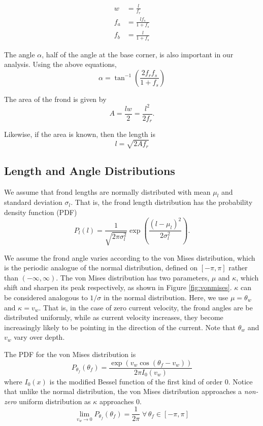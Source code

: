 \begin{align}
	w &= \frac{l}{f_r} \\
	f_a &= \frac{lf_s}{1+f_s} \\
	f_b &= \frac{l}{1+f_s}
\end{align}

The angle $\alpha$, half of the angle at the base corner, is also important in our analysis.
Using the above equations,
\begin{equation}
	\alpha = \tan^{-1}\left(\frac{2f_rf_s}{1+f_s}\right)
\end{equation}

The area of the frond is given by
\begin{equation}
  A = \frac{lw}{2} = \frac{l^2}{2f_r}.
\end{equation}

Likewise, if the area is known, then the length is
\begin{equation}
  l = \sqrt{2Af_r}
  \label{eqn:length-from-area}
\end{equation}

\subsection{Length and Angle Distributions}
\label{sec:dist}
We assume that frond lengths are normally distributed with mean $\mu_l$ and standard deviation $\sigma_l$.
That is, the frond length distribution has the probability density function (PDF)
\begin{equation}
  P_l(l) = \frac{1}{\sqrt{2\pi\sigma_l^2}}\exp\left(\frac{(l-\mu_l)^2}{2\sigma_l^2}\right).
\end{equation}

We assume the frond angle varies according to the von Mises distribution, which is the periodic analogue of the normal distribution, defined on $[-\pi,\pi]$ rather than $(-\infty,\infty)$.
The von Mises distribution has two parameters, $\mu$ and $\kappa$, which shift and sharpen its peak respectively, as shown in Figure \ref{fig:vonmises}.
$\kappa$ can be considered analogous to $1/\sigma$ in the normal distribution.
Here, we use $\mu = \theta_w$ and $\kappa = v_w$.
That is, in the case of zero current velocity, the frond angles are be distributed uniformly, while as current velocity increases, they become increasingly likely to be pointing in the direction of the current.
Note that $\theta_w$ and $v_w$ vary over depth.

The PDF for the von Mises distribution is
\begin{equation}
	P_{\theta_f}(\theta_f) = \frac{\exp\left(v_w\cos(\theta_f-v_w)\right)}{2\pi I_0(v_w)}
\end{equation}
where $I_0(x)$ is the modified Bessel function of the first kind of order 0.
Notice that unlike the normal distribution, the von Mises distribution approaches a \textit{non-zero} uniform distribution as $\kappa$ approaches 0.
\begin{equation}
	\displaystyle \lim_{v_w \to 0}P_{\theta_f}(\theta_f) = \frac{1}{2\pi} \;\forall\, \theta_f \in [-\pi,\pi]
\end{equation}

